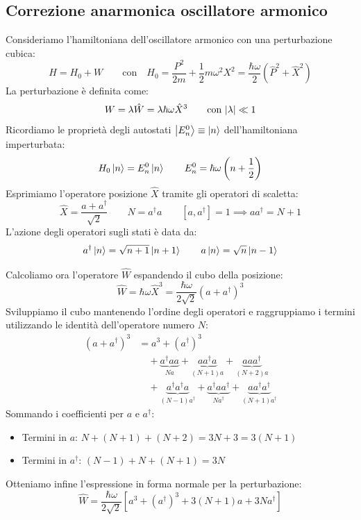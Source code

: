 \subsection{Correzione anarmonica oscillatore armonico}

Consideriamo l'hamiltoniana dell'oscillatore armonico con una perturbazione cubica:
\[
    H = H_0 + W \qquad \text{con} \quad H_0 = \frac{P^2}{2m} + \frac{1}{2}m\omega^2 X^2 = \frac{\hbar\omega}{2}\left( \hat{P}^2 + \hat{X}^2 \right)
\]
La perturbazione è definita come:
\begin{equation}
    W = \lambda \hat{W} = \lambda \hbar \omega \hat{X}^3 \qquad \text{con } \abs{\lambda} \ll 1
\end{equation}
Ricordiamo le proprietà degli autostati \(\ket{E_n^0}\equiv\ket{n}\) dell'hamiltoniana imperturbata:
\[
    H_0 \ket{n} = E_n^0 \ket{n} \qquad E_n^0 = \hbar\omega\left(n + \frac{1}{2}\right)
\]
Esprimiamo l'operatore posizione \(\hat{X}\) tramite gli operatori di scaletta:
\[
    \hat{X} = \frac{a + a^\dagger}{\sqrt{2}} \qquad N = a^\dagger a \qquad [a, a^\dagger] = 1 \implies a a^\dagger = N + 1
\]
L'azione degli operatori sugli stati è data da:
\[
    a^\dagger \ket{n} = \sqrt{n+1}\ket{n+1} \qquad a \ket{n} = \sqrt{n}\ket{n-1}
\]

Calcoliamo ora l'operatore \(\hat{W}\) espandendo il cubo della posizione:
\[
    \hat{W} = \hbar\omega \hat{X}^3 = \frac{\hbar\omega}{2\sqrt{2}} (a + a^\dagger)^3
\]
Sviluppiamo il cubo mantenendo l'ordine degli operatori e raggruppiamo i termini utilizzando le identità dell'operatore numero \(N\):
\begin{align*}
    (a + a^\dagger)^3 &= a^3 + (a^\dagger)^3 \\
    &\quad + \underbrace{a^\dagger a a}_{Na} + \underbrace{a a^\dagger a}_{(N+1)a} + \underbrace{a a a^\dagger}_{(N+2)a} \\
    &\quad + \underbrace{a^\dagger a^\dagger a}_{(N-1)a^\dagger} + \underbrace{a^\dagger a a^\dagger}_{N a^\dagger} + \underbrace{a a^\dagger a^\dagger}_{(N+1)a^\dagger}
\end{align*}
Sommando i coefficienti per \(a\) e \(a^\dagger\):
\begin{itemize}
    \item Termini in \(a\): \(N + (N+1) + (N+2) = 3N + 3 = 3(N+1)\)
    \item Termini in \(a^\dagger\): \((N-1) + N + (N+1) = 3N\)
\end{itemize}
Otteniamo infine l'espressione in forma normale per la perturbazione:
\begin{equation}
    \hat{W} = \frac{\hbar\omega}{2\sqrt{2}} \left[ a^3 + (a^\dagger)^3 + 3(N+1)a + 3N a^\dagger \right]
\end{equation}

